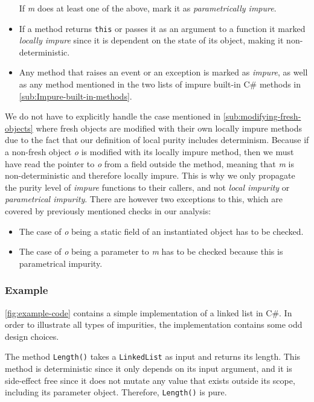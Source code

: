 \documentclass[a4paper,12pt]{article}
\begin{document}
\begin{itemize}
\begin{itemize}
    \end{itemize}
    If \textit{m} does at least one of the above, mark it as \textit{parametrically impure}.
  \item If a method returns \texttt{this} or passes it as an argument to a function it marked \textit{locally impure} since it is dependent on the state of its object, making it non-deterministic.
  \item Any method that raises an event or an exception is marked as \textit{impure}, as well as any method mentioned in the two lists of impure built-in C\# methods in \autoref{sub:Impure-built-in-methods}.
\end{itemize}

We do not have to explicitly handle the case mentioned in \autoref{sub:modifying-fresh-objects} where fresh objects are modified with their own locally impure methods due to the fact that our definition of local purity includes determinism. Because if a non-fresh object \textit{o} is modified with its locally impure method, then we must have read the pointer to \textit{o} from a field outside the method, meaning that \textit{m} is non-deterministic and therefore locally impure. This is why we only propagate the purity level of \textit{impure} functions to their callers, and not \textit{local impurity} or \textit{parametrical impurity}. There are however two exceptions to this, which are covered by previously mentioned checks in our analysis:
\begin{itemize}
  \item The case of \textit{o} being a static field of an instantiated object has to be checked.
  \item The case of \textit{o} being a parameter to \textit{m} has to be checked because this is parametrical impurity.
\end{itemize}

\subsubsection{Example} \label{ssub:Example}
\autoref{fig:example-code} contains a simple implementation of a linked list in C\#. In order to illustrate all types of impurities, the implementation contains some odd design choices.

The method \texttt{Length()} takes a \texttt{LinkedList} as input and returns its length. This method is deterministic since it only depends on its input argument, and it is side-effect free since it does not mutate any value that exists outside its scope, including its parameter object. Therefore, \texttt{Length()} is pure.
\end{document}
